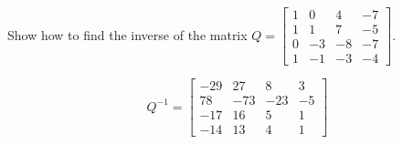 
\begin{exerciseStatement}


Show how to find the inverse of the matrix \(Q= \left[\begin{array}{cccc}
1 & 0 & 4 & -7 \\
1 & 1 & 7 & -5 \\
0 & -3 & -8 & -7 \\
1 & -1 & -3 & -4
\end{array}\right] \).


\end{exerciseStatement}
    
\begin{exerciseAnswer} 
\[Q^{-1}= \left[\begin{array}{cccc}
-29 & 27 & 8 & 3 \\
78 & -73 & -23 & -5 \\
-17 & 16 & 5 & 1 \\
-14 & 13 & 4 & 1
\end{array}\right] \]
\end{exerciseAnswer}
    
